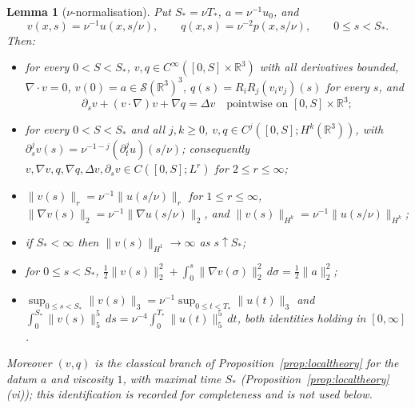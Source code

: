 \documentclass[11pt]{article}
\newtheorem{lemma}[theorem]{Lemma}
\theoremstyle{definition}
\theoremstyle{plain}
\newcommand{\R}{\mathbb R}
\newcommand{\norm}[1]{\lVert #1\rVert}
\begin{document}
\begin{lemma}[$\nu$-normalisation]\label{lem:nu-normalisation}
Put $S_*=\nu T_*$, $a=\nu^{-1}u_0$, and
\begin{equation}\label{eq:nu-normalization}
 v(x,s)=\nu^{-1}u(x,s/\nu),\qquad
 q(x,s)=\nu^{-2}p(x,s/\nu),\qquad 0\leq s<S_*.
\end{equation}
Then:
\begin{itemize}
\item[(i)] for every $0<S<S_*$, $v,q\in C^\infty([0,S]\times\R^3)$ with all
 derivatives bounded, $\nabla\cdot v=0$, $v(0)=a\in\mathcal S(\R^3)^3$,
 $q(s)=R_iR_j(v_iv_j)(s)$ for every $s$, and
 \[
  \partial_sv+(v\cdot\nabla)v+\nabla q=\Delta v
  \quad\text{pointwise on }[0,S]\times\R^3;
 \]
\item[(ii)] for every $0<S<S_*$ and all $j,k\geq0$,
 $v,q\in C^j([0,S];H^k(\R^3))$, with
 $\partial_s^jv(s)=\nu^{-1-j}(\partial_t^ju)(s/\nu)$; consequently
 $v,\nabla v,q,\nabla q,\Delta v,\partial_sv\in C([0,S];L^r)$ for
 $2\leq r\leq\infty$;
\item[(iii)] $\norm{v(s)}_r=\nu^{-1}\norm{u(s/\nu)}_r$ for $1\leq r\leq\infty$,
 $\norm{\nabla v(s)}_2=\nu^{-1}\norm{\nabla u(s/\nu)}_2$, and
 $\norm{v(s)}_{H^k}=\nu^{-1}\norm{u(s/\nu)}_{H^k}$;
\item[(iv)] if $S_*<\infty$ then $\norm{v(s)}_{H^1}\to\infty$ as $s\uparrow S_*$;
\item[(v)] for $0\leq s<S_*$,
 $\tfrac12\norm{v(s)}_2^2+\int_0^s\norm{\nabla v(\sigma)}_2^2\,d\sigma
 =\tfrac12\norm a_2^2$;
\item[(vi)] $\sup_{0\leq s<S_*}\norm{v(s)}_3=\nu^{-1}\sup_{0\leq t<T_*}\norm{u(t)}_3$
 and $\int_0^{S_*}\norm{v(s)}_5^5\,ds=\nu^{-4}\int_0^{T_*}\norm{u(t)}_5^5\,dt$,
 both identities holding in $[0,\infty]$.
\end{itemize}
Moreover $(v,q)$ is the classical branch of Proposition~\ref{prop:localtheory}
for the datum $a$ and viscosity $1$, with maximal time $S_*$
(Proposition~\ref{prop:localtheory}(vi)); this identification is recorded
for completeness and is not used below.
\end{lemma}
\end{document}
